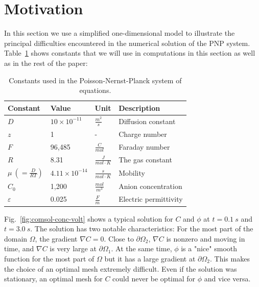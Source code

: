 \section{Motivation} \label{sec:moti}

In this section we use a simplified one-dimensional model to illustrate the 
principal difficulties encountered in the numerical solution of the 
PNP system.
Table~\ref{Table:used-constants} shows constants that we will use in 
computations in this section as well as in the rest of the paper: 

\begin{table}[!ht]
\caption{Constants used in the Poisson-Nernst-Planck system of equations.}
\centering
\label{Table:used-constants}
{
\begin{tabular}{llll}
  \hline \hline
  Constant&Value&Unit&Description\\
  \hline
  $D$&$10\times10^{-11}$&$\frac{m^2}{s}$&Diffusion constant\\
  $z$&1&-&Charge number\\
  $F$&96,485&$\frac{C}{mol}$&Faraday number\\
  $R$&8.31&$\frac{J}{mol\cdot K}$&The gas constant\\
  $\mu\ \left( = \frac{D}{RT}\right)$&$4.11\times 10^{-14}$&$\frac{s}{mol\cdot K}$&Mobility\\
  $C_{0}$&1,200&$\frac{mol}{m^3}$&Anion concentration\\
  $\varepsilon$&0.025&$\frac{F}{m}$&Electric permittivity\\
  \hline
  \hline
\end{tabular}
}
\end{table}


Fig.~\ref{fig:comsol-conc-volt} shows a typical solution for $C$ and $\phi$
at $t=0.1\ s$ and $t=3.0\ s$. 
The solution has 
two notable characteristics: For the most part of the domain $\Omega$,
the gradient $\nabla C = 0$. Close to $\partial \Omega_2$, $\nabla C$ is
nonzero and moving in time, and $\nabla C$ is very large at $\partial \Omega_1$.
At the same time, $\phi$ is a "nice" smooth function for the most part of 
$\Omega$ but it has a large gradient at $\partial \Omega_2$.
This makes the choice of an optimal mesh extremely difficult. Even if the 
solution was stationary, an optimal mesh for $C$ could never be 
optimal for $\phi$ and vice versa.


